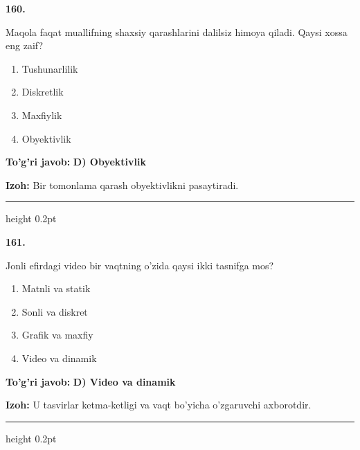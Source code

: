 \documentclass[10pt,a4paper,oneside]{article}
\begin{document}
\noindent\textbf{\color{ink}160.}
\par
Maqola faqat muallifning shaxsiy qarashlarini dalilsiz himoya qiladi. Qaysi xossa eng zaif?
\begin{enumerate}[label=\Alph*),leftmargin=9mm]
\item Tushunarlilik
\item Diskretlik
\item Maxfiylik
\item Obyektivlik
\end{enumerate}
\begin{tcolorbox}[enhanced,breakable,colback=teal!4,colframe=teal!50!black,boxrule=0.5pt,arc=1.1mm,left=3mm,right=3mm,top=1.7mm,bottom=1.7mm,before skip=2mm,after skip=2mm]
\textbf{\color{teal}To'g'ri javob:} \textbf{D) Obyektivlik}
\par\smallskip
\textbf{Izoh:} Bir tomonlama qarash obyektivlikni pasaytiradi.
\end{tcolorbox}
\vspace{2mm}\hrule height 0.2pt \vspace{3mm}

\noindent\textbf{\color{ink}161.}
\par
Jonli efirdagi video bir vaqtning o'zida qaysi ikki tasnifga mos?
\begin{enumerate}[label=\Alph*),leftmargin=9mm]
\item Matnli va statik
\item Sonli va diskret
\item Grafik va maxfiy
\item Video va dinamik
\end{enumerate}
\begin{tcolorbox}[enhanced,breakable,colback=teal!4,colframe=teal!50!black,boxrule=0.5pt,arc=1.1mm,left=3mm,right=3mm,top=1.7mm,bottom=1.7mm,before skip=2mm,after skip=2mm]
\textbf{\color{teal}To'g'ri javob:} \textbf{D) Video va dinamik}
\par\smallskip
\textbf{Izoh:} U tasvirlar ketma-ketligi va vaqt bo'yicha o'zgaruvchi axborotdir.
\end{tcolorbox}
\vspace{2mm}\hrule height 0.2pt \vspace{3mm}
\end{document}
